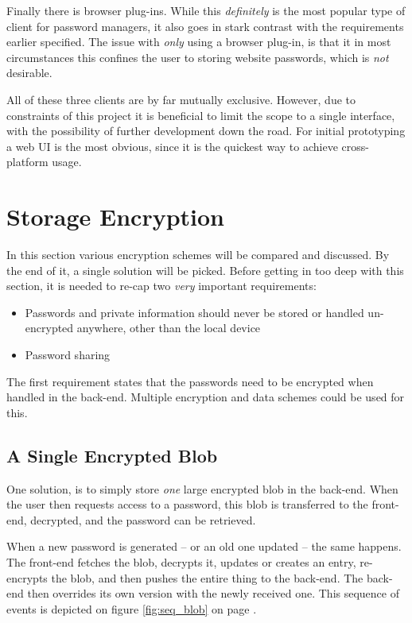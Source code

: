 		Finally there is browser plug-ins. While this \emph{definitely} is the most popular type of client for password managers, it also goes in stark contrast with the requirements earlier specified. The issue with \emph{only} using a browser plug-in, is that it in most circumstances this confines the user to storing website passwords, which is \emph{not} desirable.

		All of these three clients are by far mutually exclusive. However, due to constraints of this project it is beneficial to limit the scope to a single interface, with the possibility of further development down the road. For initial prototyping a web UI is the most obvious, since it is the quickest way to achieve cross-platform usage. 

	\section{Storage Encryption}
		In this section various encryption schemes will be compared and discussed. By the end of it, a single solution will be picked. Before getting in too deep with this section, it is needed to re-cap two \emph{very} important requirements:
		\begin{itemize}
			\item Passwords and private information should never be stored or handled un-encrypted anywhere, other than the local device
			\item Password sharing
		\end{itemize}

		The first requirement states that the passwords need to be encrypted when handled in the back-end. Multiple encryption and data schemes could be used for this.

		\subsection{A Single Encrypted Blob}
			One solution, is to simply store \emph{one} large encrypted blob in the back-end. When the user then requests access to a password, this blob is transferred to the front-end, decrypted, and the password can be retrieved. 

			When a new password is generated -- or an old one updated -- the same happens. The front-end fetches the blob, decrypts it, updates or creates an entry, re-encrypts the blob, and then pushes the entire thing to the back-end. The back-end then overrides its own version with the newly received one. This sequence of events is depicted on figure \ref{fig:seq_blob} on page \pageref{fig:seq_blob}.

